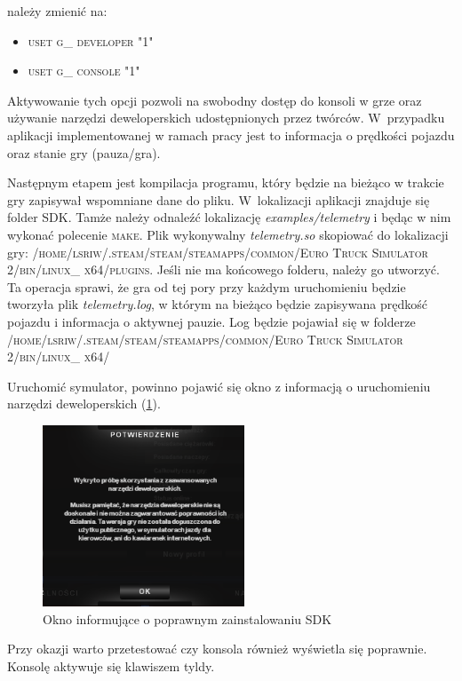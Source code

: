 należy zmienić na:

\begin{itemize}
\item \textsc{uset g\_ developer "1"}
\item \textsc{uset g\_ console "1"}
\end{itemize}

Aktywowanie tych opcji pozwoli na swobodny dostęp do konsoli w grze oraz używanie narzędzi deweloperskich udostępnionych przez twórców. 
W~przypadku aplikacji implementowanej w ramach pracy jest to informacja o prędkości pojazdu oraz stanie gry (pauza/gra). 

Następnym etapem jest kompilacja programu, który będzie na bieżąco w trakcie gry zapisywał wspomniane dane do pliku.
W~lokalizacji aplikacji znajduje się folder SDK. 
Tamże należy odnaleźć lokalizację \textit{examples/telemetry} i będąc w nim wykonać polecenie \textsc{make}. 
Plik wykonywalny \textit{telemetry.so} skopiować do lokalizacji gry: \textsc{/home/lsriw/.steam/steam/steamapps/common/Euro Truck Simulator 2/bin/linux\_ x64/plugins}. 
Jeśli nie ma końcowego folderu, należy go utworzyć.
Ta operacja sprawi, że gra od tej pory przy każdym uruchomieniu będzie tworzyła plik \textit{telemetry.log}, w którym na bieżąco będzie zapisywana prędkość pojazdu i informacja o aktywnej pauzie. 
Log będzie pojawiał się w folderze \textsc{/home/lsriw/.steam/steam/steamapps/common/Euro Truck Simulator 2/bin/linux\_ x64/}

Uruchomić symulator, powinno pojawić się okno z informacją o uruchomieniu narzędzi deweloperskich (\ref{fig:appendix1_dev_tools}).

\begin{figure}
  \centering
  \includegraphics[width=6cm]{img/appendix1_devtools.png}
  \caption{Okno informujące o poprawnym zainstalowaniu SDK}
  \label{fig:appendix1_dev_tools}
\end{figure}

Przy okazji warto przetestować czy konsola również wyświetla się poprawnie. 
Konsolę aktywuje się klawiszem tyldy.

